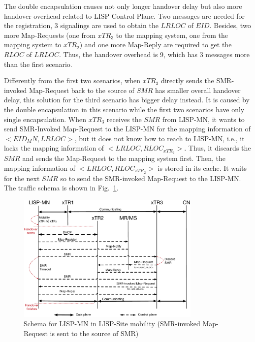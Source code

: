 The double encapsulation causes not only longer handover delay but also more handover overhead related to LISP Control Plane. Two messages are needed for the registration, 3 signalings are used to obtain the $LRLOC$ of $EID$. Besides, two more Map-Requests (one from $xTR_3$ to the mapping system, one from the mapping system to $xTR_2$) and one more Map-Reply are required to get the $RLOC$ of $LRLOC$. Thus, the handover overhead is 9, which has 3 messages more than the first scenario.

Differently from the first two scenarios, when $xTR_3$ directly sends the SMR-invoked Map-Request back to the source of $SMR$ has smaller overall handover delay, this solution for the third scenario has bigger delay instead. It is caused by the double encapsulation in this scenario while the first two scenarios have only single encapsulation. When $xTR_3$ receives the $SMR$ from LISP-MN, it wants to send SMR-Invoked Map-Request to the LISP-MN for the mapping information of $<EID_MN, LRLOC>$, but it does not know how to reach to LISP-MN, i.e., it lacks the mapping information of $<LRLOC, RLOC_{xTR_2}>$. Thus, it discards the $SMR$ and sends the Map-Request to the mapping system first. Then, the mapping information of $<LRLOC, RLOC_{xTR_2}>$ is stored in its cache. It waits for the next $SMR$ so to send the SMR-invoked Map-Request to the LISP-MN. The traffic schema is shown in Fig.~\ref{Mobility_double_encap_schema_SMR_askxTR_simplify}.
\begin{figure}[!t]
	\centering
	\includegraphics[width=0.8\textwidth]{Pics/Mobility_double_encap_schema_SMR_askxTR_simplify}
	\caption{Schema for LISP-MN in LISP-Site mobility (SMR-invoked Map-Request is sent to the source of SMR)}
	\label{Mobility_double_encap_schema_SMR_askxTR_simplify}
\end{figure}

